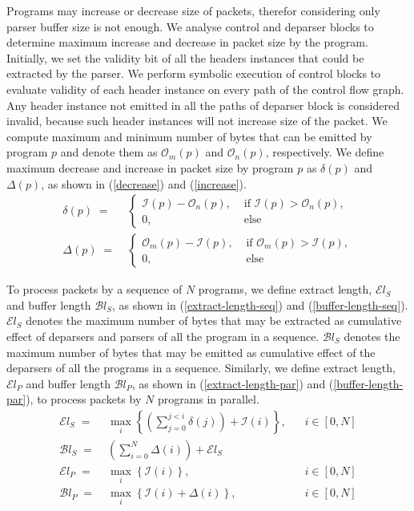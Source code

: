 Programs may increase or decrease size of packets, therefor considering only parser buffer size is not enough.
We analyse control and deparser blocks to determine maximum increase and decrease in packet size by the program.
Initially, we set the validity bit of all the headers instances that could be extracted by the parser. 
We perform symbolic execution of control blocks to evaluate validity of each header instance on every path of the control flow graph.
Any header instance not emitted in all the paths of deparser block is considered invalid, because such header instances will not increase size of the packet.
We compute maximum and minimum number of bytes that can be emitted by program $p$ and denote them as $\mathcal{O}_{m}(p)$ and $\mathcal{O}_{n}(p)$, respectively.
We define maximum decrease and increase in packet size by program $p$ as $\delta(p)$ and $\Delta(p)$, as shown in (\ref{decrease}) and (\ref{increase}).
\begin{align}
\delta(p)\; =& \; \begin{cases}
\mathcal{I}(p) - \mathcal{O}_{n}(p), & \text{ if } \mathcal{I}(p) > \mathcal{O}_{n}(p), \\
0, & \text{ else }
\end{cases} \label{decrease} \\
\Delta(p) \; =& \; \begin{cases}
\mathcal{O}_{m}(p) - \mathcal{I}(p), & \text{ if } \mathcal{O}_{m}(p) > \mathcal{I}(p), \\
0, & \text{ else } \label{increase}
\end{cases}
\end{align}

To process packets by a sequence of $N$ programs, we define extract length, $\mathcal{E}l_{S}$ and buffer length $\mathcal{B}l_{S}$, as shown in (\ref{extract-length-seq}) and (\ref{buffer-length-seq}).
$\mathcal{E}l_{S}$ denotes the maximum number of bytes that may be extracted as cumulative effect of deparsers and parsers of all the program in a sequence.
$\mathcal{B}l_{S}$ denotes the maximum number of bytes that may be emitted as cumulative effect of the deparsers of all the programs in a sequence.
Similarly, we define extract length, $\mathcal{E}l_{P}$ and buffer length $\mathcal{B}l_{P}$, as shown in (\ref{extract-length-par}) and (\ref{buffer-length-par}), to process packets by $N$ programs in parallel.
\begin{align}
\mathcal{E}l_{S} \; =& \; \max_{i} \left\{ \left( \sum_{j=0}^{j<i} \delta(j) \right)+ \mathcal{I}(i) \right\},&\;\;\;i  \in [0,N] \label{extract-length-seq} \\
\mathcal{B}l_{S} \; =& \; \left( \sum_{i=0}^{N} \Delta(i) \right)+ \mathcal{E}l_{S} & \label{buffer-length-seq} \\
\mathcal{E}l_{P} \; =& \; \max_{i} \left\{ \mathcal{I}(i) \right\},&\;\;\;i  \in [0,N] \label{extract-length-par} \\
\mathcal{B}l_{P} \; =& \; \max_{i} \left\{ \mathcal{I}(i) + \Delta(i) \right\},&\;\;\;i  \in [0,N]  \label{buffer-length-par}
\end{align}


